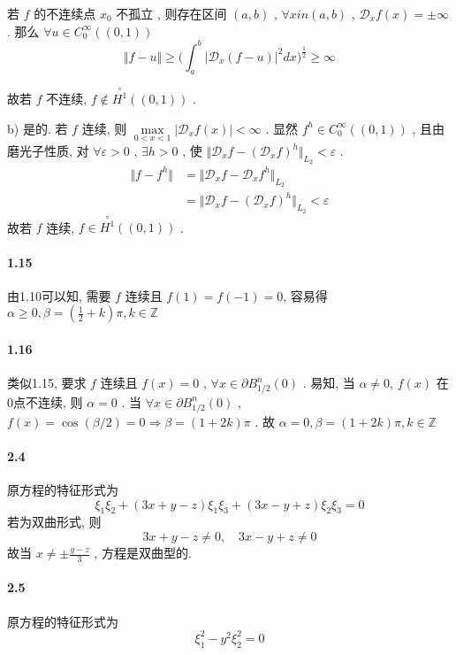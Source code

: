 \documentclass[a4paper, UTF8]{ctexart}				%
\begin{document}
        若 $f$ 的不连续点 $x_0$ 不孤立 , 则存在区间 $(a,b)$ , $\forall x in (a,b)$ , $\mathcal{D}_x f(x)  = \pm\infty$ . 那么 $\forall u \in C^{\infty}_0((0,1))$
        \[
            \Vert{f-u}\Vert \ge \biggl(\int^{b}_{a} \vert{\mathcal{D}_x (f-u)}\vert^2 dx \biggl)^{\frac{1}{2}} \ge \infty
        \]

        故若 $f$ 不连续, $f \notin \stackrel{\circ}{H^1}((0,1))$ .

        b) 是的. 若 $f$ 连续, 则 $\max\limits_{0<x<1}\vert{\mathcal{D}_x f(x)}\vert < \infty$ . 显然 $f^h \in C^{\infty}_0((0,1))$ , 且由磨光子性质, 对 $\forall \varepsilon > 0$ , $\exists h > 0$ , 使 $\Vert{\mathcal{D}_x f - (\mathcal{D}_x f)^h}\Vert_{L_2} < \varepsilon$ .
        \[
            \begin{split}
                \Vert{f-f^h}\Vert
                & = \Vert{\mathcal{D}_x f - \mathcal{D}_x f^h}\Vert_{L_2}\\
                & = \Vert{\mathcal{D}_x f - (\mathcal{D}_x f)^h}\Vert_{L_2}
                < \varepsilon
            \end{split}
        \]
        故若 $f$ 连续, $f \in \stackrel{\circ}{H^1}((0,1))$ .
    \paragraph{1.15}\quad 
        由1.10可以知, 需要 $f$ 连续且 $f(1) = f(-1) = 0$, 容易得 $\alpha \ge 0, \beta = (\frac{1}{2} + k) \pi, k \in \mathbb{Z}$
    \paragraph{1.16}\quad 
        类似1.15, 要求 $f$ 连续且 $f(x) = 0$ , $\forall x \in \partial B^n_{1/2}(0)$ . 易知, 当 $\alpha \neq 0$, $f(x)$ 在0点不连续, 则 $\alpha = 0$ . 当 $\forall x \in \partial B^n_{1/2}(0)$ , $f(x) = \cos(\beta/2) = 0 \Rightarrow \beta = (1+2k)\pi$ . 故 $\alpha = 0, \beta = (1+2k)\pi, k \in \mathbb{Z}$

    \paragraph{2.4}\quad
        原方程的特征形式为 
        \[
            \xi_1 \xi_2 + (3x + y - z) \xi_1 \xi_3 + (3x - y + z)\xi_2\xi_3 = 0
        \]
        若为双曲形式, 则 
        \[
            3x + y - z \neq 0 , \quad 3x - y + z \neq 0
        \]
        故当 $x \neq \pm \frac{y-z}{3}$ , 方程是双曲型的.
    \paragraph{2.5}\quad 
        原方程的特征形式为 
        \[
            \xi_1^2 - y^2\xi_2^2 = 0
        \]
\end{document}
